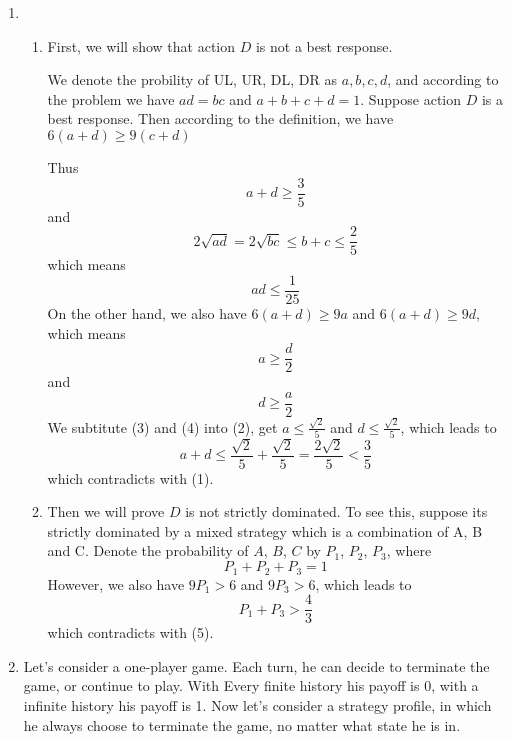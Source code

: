 \documentclass[12pt]{cgtmd}
\begin{document}

\begin{enumerate}
    \item 
        \begin{enumerate}
            \item
                First, we will show that action $D$ is not a best response.

                We denote the probility of UL, UR, DL, DR as $a, b, c, d$, and according to the problem we have $ad = bc$ and $a + b + c + d = 1$.  Suppose action $D$ is a best response. Then according to the definition, we have
                $6(a + d) \geq 9(c + d)$

                Thus
                \begin{equation}
                    a + d \geq \frac{3}{5}
                \end{equation}
                and
                $$2\sqrt{ad} = 2\sqrt{bc} \leq b + c \leq \frac{2}{5}$$
                which means
                \begin{equation}
                    ad \leq \frac{1}{25}
                \end{equation}
                On the other hand, we also have $6(a + d) \geq 9a$ and $6(a + d) \geq 9d$, which means
                \begin{equation}
                    a \geq \frac{d}{2} 
                \end{equation}
                and
                \begin{equation}
                    d \geq \frac{a}{2}
                \end{equation}
                We subtitute (3) and (4) into (2), get $a \leq \frac{\sqrt{2}}{5}$ and $d \leq \frac{\sqrt{2}}{5}$, which leads to
                $$a + d \leq \frac{\sqrt{2}}{5} + \frac{\sqrt{2}}{5}  = \frac{2\sqrt{2}}{5} < \frac{3}{5}$$
                which contradicts with (1).
            \item 
                Then we will prove $D$ is not strictly dominated. To see this, suppose its strictly dominated by
                a mixed strategy which is a combination of A, B and C. Denote the probability of $A$, $B$, $C$ by $P_1$, $P_2$, $P_3$, where 
                \begin{equation}
                    P_1 + P_2 + P_3 = 1
                \end{equation}
                However, we also have $9P_1 > 6$ and $9P_3 > 6$, which leads to 
                $$P_1 + P_3 > \frac{4}{3}$$
                which contradicts with (5).
        \end{enumerate}
    \item Let's consider a one-player game. Each turn, he can decide to terminate the game, or continue to play. With Every finite history his payoff is 0, with a infinite history his payoff is 1. Now let's consider a strategy profile, in which he always choose to terminate the game, no matter what state he is in. 
        

\end{enumerate}
\end{document}

